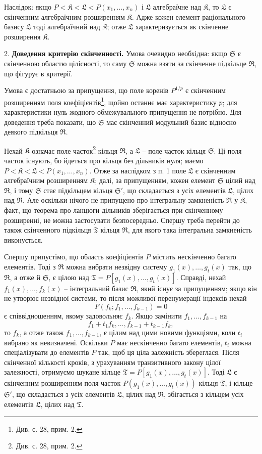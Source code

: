 \documentclass[11pt]{article}
\begin{document}
Наслідок: якщо $P<\mathfrak K<\mathfrak L<P(x_1,\ldots,x_n)$ і $\mathfrak L$ алгебраїчне над $\mathfrak K$, то $\mathfrak L$ є скінченним алгебраїчним розширенням $\mathfrak K$. Адже кожен елемент раціонального базису $\mathfrak L$ тоді алгебраїчний над $\mathfrak K$; отже $\mathfrak L$ характеризується як скінченне розширення $\mathfrak K$.

2. \textbf{Доведення критерію скінченності.} Умова очевидно необхідна: якщо $\mathfrak S$ є скінченною областю цілісності, то саму $\mathfrak S$ можна взяти за скінченне підкільце $\mathfrak R$, що фігурує в критерії.

Умова є достатньою за припущення, що поле коренів $P^{1/p}$ є скінченним розширенням поля коефіцієнтів\footnote{Див. с. 28, прим. 2.}, щойно останнє має характеристику $p$; для характеристики нуль жодного обмежувального припущення не потрібно. Для доведення треба показати, що $\mathfrak S$ має скінченний модульний базис відносно деякого підкільця $\mathfrak R$.

Нехай $\mathfrak K$ означає поле часток\footnote{Див. с. 28, прим. 2.} кільця $\mathfrak R$, а $\mathfrak L$ -- поле часток кільця $\mathfrak S$. Ці поля часток існують, бо йдеться про кільця без дільників нуля; маємо $P<\mathfrak K<\mathfrak L<P(x_1,\ldots,x_n)$. Отже за наслідком з п. 1 поле $\mathfrak L$ є скінченним алгебраїчним розширенням $\mathfrak K$; далі, за припущенням, кожен елемент $\mathfrak S$ цілий над $\mathfrak R$, і тому $\mathfrak S$ стає підкільцем кільця $\mathfrak S'$, що складається з усіх елементів $\mathfrak L$, цілих над $\mathfrak R$. Але оскільки нічого не припущено про інтегральну замкненість $\mathfrak R$ у $\mathfrak K$, факт, що теорема про ланцюги дільників зберігається при скінченному розширенні, не можна застосувати безпосередньо. Спершу треба перейти до також скінченного підкільця $\mathfrak T$ кільця $\mathfrak R$, для якого така інтегральна замкненість виконується.

Спершу припустімо, що область коефіцієнтів $P$ містить нескінченно багато елементів. Тоді з $\mathfrak R$ можна вибрати незвідну систему $g_1(x),\ldots,g_t(x)$ так, що $\mathfrak R$, а отже й $\mathfrak S$, є цілою над $\mathfrak T=P[g_1(x),\ldots,g_t(x)]$. Справді, нехай $f_1(x),\ldots,f_k(x)$ -- інтегральний базис $\mathfrak R$, який існує за припущенням; якщо він не утворює незвідної системи, то після можливої перенумерації індексів нехай
\[
F(f_k;f_1,\ldots,f_{k-1})=0
\]
є співвідношенням, якому задовольняє $f_k$. Якщо замінити $f_1,\ldots,f_{k-1}$ на
\[
 f_1+t_1f_k,\ldots,f_{k-1}+t_{k-1}f_k,
\]
то $f_k$, а отже також $f_1,\ldots,f_{k-1}$, є цілим над цими новими функціями, коли $t_i$ вибрано як невизначені. Оскільки $P$ має нескінченно багато елементів, $t_i$ можна спеціалізувати до елементів $P$ так, щоб ця ціла залежність збереглася. Після скінченної кількості кроків, з урахуванням транзитивного закону цілої залежності, отримуємо шукане кільце $\mathfrak T=P[g_1(x),\ldots,g_t(x)]$. Тоді $\mathfrak L$ є скінченним розширенням поля часток $P(g_1(x),\ldots,g_t(x))$ кільця $\mathfrak T$, і кільце $\mathfrak S'$, що складається з усіх елементів $\mathfrak L$, цілих над $\mathfrak R$, збігається з кільцем усіх елементів $\mathfrak L$, цілих над $\mathfrak T$.
\end{document}
